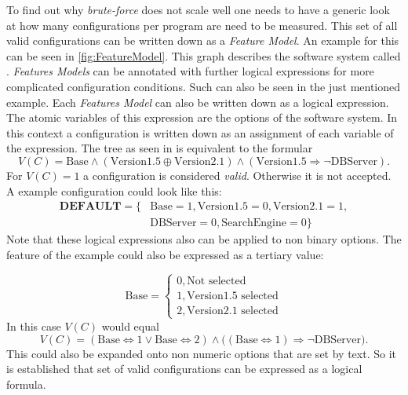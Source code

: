 To find out why \textit{brute-force} does not scale well one needs to have a generic look at how many configurations per program are need to be measured. This set of all valid configurations can be written down as a \textit{Feature Model}. An example for this can be seen in \cref{fig:FeatureModel}. This graph describes the software system called . \textit{Features Models} can be annotated with further logical expressions for more complicated configuration conditions. Such can also be seen in the just mentioned example. Each \textit{Features Model} can also be written down as a logical expression. The atomic variables of this expression are the options of the software system. In this context a configuration is written down as an assignment of each variable of the expression. The tree as seen in  is equivalent to the formular
\begin{equation*}
	V(C)= \text{Base} \land (\text{Version1.5} \oplus \text{Version2.1}) \land (\text{Version1.5} \Rightarrow \neg \text{DBServer}).%
\end{equation*}
For $V(C)=1$ a configuration is considered \textit{valid}. Otherwise it is not accepted.
A example configuration could look like this:
\begin{align*}
	\textbf{DEFAULT} =  \{&\text{Base} = 1, \text{Version1.5}=0, \text{Version2.1} = 1, \\
	&\text{DBServer} =0, \text{SearchEngine} =0 \}
\end{align*}
Note that these logical expressions also can be applied to non binary options. The feature  of the example could also be expressed as a tertiary value:

\begin{equation*}
	\text{Base} =  \begin{cases}
		0, \text{Not selected}\\
		1, \text{Version1.5 selected}\\
		2, \text{Version2.1 selected}
	\end{cases}
\end{equation*}
In this case $V(C)$ would equal
\begin{equation*}
		V(C)= (\text{Base} \Leftrightarrow 1 \lor \text{Base} \Leftrightarrow 2) \land \big((\text{Base} \Leftrightarrow 1) \Rightarrow \neg \text{DBServer}\big).
\end{equation*}
This could also be expanded onto non numeric options that are set by text. So it is established that set of valid configurations can be expressed as a logical formula.

